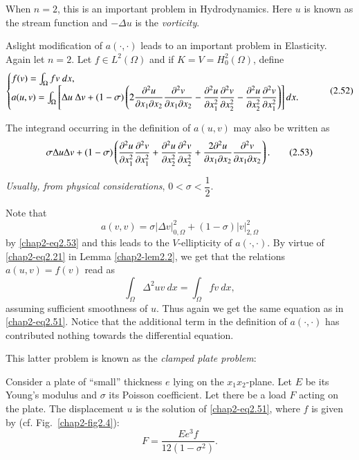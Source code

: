 \begin{example}
When $n=2$, this is an important problem in Hydrodynamics. Here $u$ is
known as the stream function and $-\Delta u$ is the {\em vorticity}.


A\pageoriginale slight modification of $a(\cdot,\cdot)$ leads to an
important problem in Elasticity. Again let $n=2$. Let $f\in
L^{2}(\Omega)$ and if $K=V=H^{2}_{0}(\Omega)$, define 
{\fontsize{9}{11}\selectfont
\begin{equation*}
\begin{cases}
f(v)=\int_{\Omega}fv\ dx,\\
a(u,v)=\int_{\Omega}\left[\Delta u\ \Delta
  v+(1-\sigma)\left(2\dfrac{\partial^{2}u}{\partial x_{1}\partial x_{2}}\dfrac{\partial^{2}v}{\partial
    x_{1}\partial x_{2}}-\dfrac{\partial^{2}u}{\partial x^{2}_{1}}\dfrac{\partial^{2}v}{\partial
    x^{2}_{2}}-\dfrac{\partial^{2}u}{\partial x^{2}_{2}}\dfrac{\partial^{2}v}{\partial
    x^{2}_{1}}\right)\right]dx. 
\end{cases}\tag{2.52}\label{chap2-eq2.52}
\end{equation*}}

The integrand occurring in the definition of $a(u,v)$ may also be
written as
\begin{equation*}
\sigma \Delta u\Delta v+(1-\sigma)\left(\frac{\partial^{2}u}{\partial
  x^{2}_{1}}\frac{\partial^{2}v}{\partial x^{2}_{1}}+\frac{\partial^{2}u}{\partial
  x^{2}_{2}}\frac{\partial^{2}v}{\partial x^{2}_{2}}+\frac{2\partial^{2}u}{\partial x_{1}\partial
  x_{2}}\frac{\partial^{2}v}{\partial x_{1}\partial
  x_{2}}\right). \tag{2.53}\label{chap2-eq2.53} 
\end{equation*}

{\em Usually, from physical considerations}, $0<\sigma<\dfrac{1}{2}$.

Note that
\begin{equation*}
a(v,v)=\sigma|\Delta
v|^{2}_{0,\Omega}+(1-\sigma)|v|^{2}_{2,\Omega}\tag{2.54}\label{chap2-eq2.54} 
\end{equation*}
by \eqref{chap2-eq2.53} and this leads to the $V$-ellipticity of
$a(\cdot,\cdot)$. By virtue of \eqref{chap2-eq2.21} in Lemma
\ref{chap2-lem2.2}, we get that the relations $a(u,v)=f(v)$ read as
\begin{equation*}
\int_{\Omega}\Delta^{2}uv\ dx=\int_{\Omega}fv\ dx,\tag{2.55}\label{chap2-eq2.55} 
\end{equation*}
assuming sufficient smoothness of $u$. Thus again we get the same
equation as in \eqref{chap2-eq2.51}. Notice that the additional term
in the definition of $a(\cdot,\cdot)$ has contributed nothing towards
the differential equation.

This latter problem is known as the {\em clamped plate problem}: 

Consider a plate of ``small'' thickness $e$ lying on the
$x_{1}x_{2}$-plane. Let $E$ be its Young's modulus and $\sigma$ its
Poisson coefficient. Let there be a load $F$ acting on the plate. The
displacement $u$ is the solution of \eqref{chap2-eq2.51}, where $f$ is
given by (cf. Fig.~\ref{chap2-fig2.4}):
\begin{equation*}
F=\frac{E e^{3}f}{12(1-\sigma^{2})}.\tag{2.56}\label{chap2-eq2.56}
\end{equation*}\pageoriginale
\end{example}
